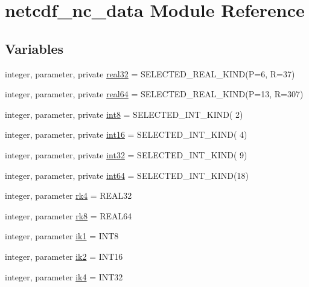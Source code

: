 \hypertarget{namespacenetcdf__nc__data}{}\section{netcdf\+\_\+nc\+\_\+data Module Reference}
\label{namespacenetcdf__nc__data}
\subsection*{Variables}
\begin{DoxyCompactItemize}
\item 
integer, parameter, private \hyperlink{namespacenetcdf__nc__data_a49ce5cf5f98711e2fb1c1d1fff07ced3}{real32} = S\+E\+L\+E\+C\+T\+E\+D\+\_\+\+R\+E\+A\+L\+\_\+\+K\+I\+ND(P=6, R=37)
\item 
integer, parameter, private \hyperlink{namespacenetcdf__nc__data_ab45e80c04977fcdc637bf85e96fb1bbd}{real64} = S\+E\+L\+E\+C\+T\+E\+D\+\_\+\+R\+E\+A\+L\+\_\+\+K\+I\+ND(P=13, R=307)
\item 
integer, parameter, private \hyperlink{namespacenetcdf__nc__data_a7a38aef8544775b499eab82d49160d8f}{int8} = S\+E\+L\+E\+C\+T\+E\+D\+\_\+\+I\+N\+T\+\_\+\+K\+I\+ND( 2)
\item 
integer, parameter, private \hyperlink{namespacenetcdf__nc__data_afb8a8087476621863a989d4767e0098b}{int16} = S\+E\+L\+E\+C\+T\+E\+D\+\_\+\+I\+N\+T\+\_\+\+K\+I\+ND( 4)
\item 
integer, parameter, private \hyperlink{namespacenetcdf__nc__data_a46f18116f7eef966c6ca8e2a32146c1f}{int32} = S\+E\+L\+E\+C\+T\+E\+D\+\_\+\+I\+N\+T\+\_\+\+K\+I\+ND( 9)
\item 
integer, parameter, private \hyperlink{namespacenetcdf__nc__data_a1fdc3bacc11102e964238610883f87aa}{int64} = S\+E\+L\+E\+C\+T\+E\+D\+\_\+\+I\+N\+T\+\_\+\+K\+I\+ND(18)
\item 
integer, parameter \hyperlink{namespacenetcdf__nc__data_a223f303ec527e29600c338ab11a44f1e}{rk4} = R\+E\+A\+L32
\item 
integer, parameter \hyperlink{namespacenetcdf__nc__data_ade82ed46db72e1615dada1c3ead06d51}{rk8} = R\+E\+A\+L64
\item 
integer, parameter \hyperlink{namespacenetcdf__nc__data_abec5c1fcdc88e0df15e1881f76fe2009}{ik1} = I\+N\+T8
\item 
integer, parameter \hyperlink{namespacenetcdf__nc__data_a2737071cdb438e603153e900a48f747e}{ik2} = I\+N\+T16
\item 
integer, parameter \hyperlink{namespacenetcdf__nc__data_a4704b689ce13181f04478d859655b674}{ik4} = I\+N\+T32

\end{DoxyCompactItemize}
